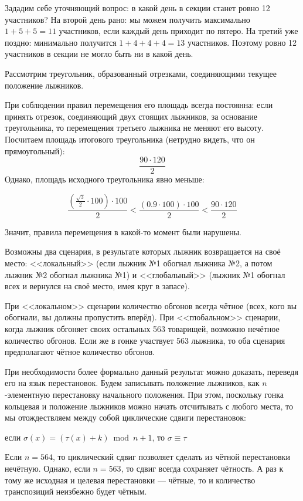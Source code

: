 \begin{itemize}
\itA Зададим себе уточняющий вопрос: в какой день в секции станет ровно 12 участников?
На второй день рано: мы можем получить максимально $1+5+5=11$ участников, если каждый день приходит по пятеро.
На третий уже поздно: минимально получится $1+4+4+4=13$ участников. 
Поэтому ровно 12 участников в секции не могло быть ни в какой день.

\itB Рассмотрим треугольник, образованный отрезками, соединяющими текущее положение лыжников.

\begin{center}  \end{center}

При соблюдении правил перемещения его площадь всегда постоянна: если принять
отрезок, соединяющий двух стоящих лыжников, за основание треугольника, 
то перемещения третьего лыжника не меняют его высоту.
Посчитаем площадь итогового треугольника (нетрудно видеть, что он прямоугольный): $$\frac{90\cdot 120}{2}$$
Однако, площадь исходного треугольника явно меньше:

$$\frac{\left(\frac{\sqrt{3}}{2}\cdot 100\right) \cdot 100}{2} < \frac{(0.9 \cdot 100) \cdot 100}{2} < \frac{90 \cdot 120}{2}$$

Значит, правила перемещения в какой-то момент были нарушены.

\itC Возможны два сценария, в результате которых лыжник возвращается на своё место: <<локальный>> 
(если лыжник №1 обогнал лыжника №2, а потом лыжник №2 обогнал лыжника №1) и <<глобальный>>
(лыжник №1 обогнал всех и вернулся на своё место, имея круг в запасе).

При <<локальном>> сценарии количество обгонов всегда чётное (всех, кого вы обогнали, вы должны пропустить вперёд).
При <<глобальном>> сценарии, когда лыжник обгоняет своих остальных 563 товарищей, возможно нечётное
количество обгонов.
Если же в гонке участвует 563 лыжника, то оба сценария предполагают чётное количество обгонов.

При необходимости 
более формально данный результат можно доказать, переведя его на язык перестановок. 
Будем записывать положение лыжников, как $n$-элементную перестановку начального 
положения. 
При этом, поскольку гонка кольцевая и положение лыжников
можно начать отсчитывать с любого места, то мы отождествляем между собой циклические
сдвиги перестановок: 
\begin{center}если $\sigma(x) = (\tau(x)+k) \bmod n + 1$, то $\sigma \equiv \tau$
\end{center}

Если $n = 564$, то циклический сдвиг позволяет сделать из чётной перестановки
нечётную. Однако, если $n=563$, то сдвиг всегда сохраняет чётность.
А раз к тому же исходная и целевая перестановки --- чётные, то и количество транспозиций неизбежно будет чётным. 

\end{itemize}
